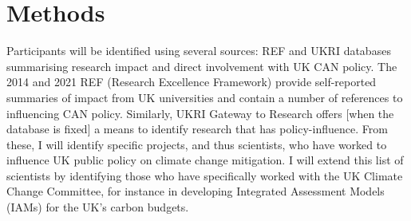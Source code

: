 \chapter{Methods}\label{ch:methods}

Participants will be identified using several sources: REF and UKRI databases summarising research impact and direct involvement with UK CAN policy. The 2014 and 2021 REF (Research Excellence Framework) provide self-reported summaries of impact from UK universities and contain a number of references to influencing CAN policy. Similarly, UKRI Gateway to Research offers [when the database is fixed] a means to identify research that has policy-influence. From these, I will identify specific projects, and thus scientists, who have worked to influence UK public policy on climate change mitigation. I will extend this list of scientists by identifying those who have specifically worked with the UK Climate Change Committee, for instance in developing Integrated Assessment Models (IAMs) for the UK’s carbon budgets.